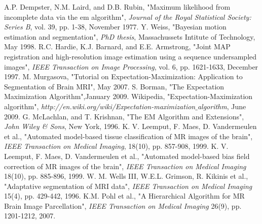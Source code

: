 \begin{thebibliography}{9999}%
%
A.P. Dempster, N.M. Laird, and D.B. Rubin, "Maximum likelihood from incomplete data via the em algorithm", \textsl{Journal of the Royal Statistical Society: Series B}, vol. 39, pp. 1-38, November 1977.
%
Y. Weiss, "Bayesian motion estimation and segmentation", \textsl{PhD thesis}, Massachussets Intitute of Technology, May 1998.
%
R.C. Hardie, K.J. Barnard, and E.E. Armstrong, "Joint MAP registration and high-resolution image estimation using a sequence undersampled images", \textsl{IEEE Transaction on Image Processing}, vol. 6, pp. 1621-1633, December 1997.
%
M. Murgasova, "Tutorial on Expectation-Maximization: Application to Segmentation of Brain MRI", May 2007.
%
S. Borman, "The Expectation Maximization Algorithm",January 2009.
%
Wikipedia, "Expectation-Maximization algorithm", \textsl{http://en.wiki.org/wiki/Expectation-maximization$\_$algorithm}, June 2009.
%
G. McLachlan, and T. Krishnan, "The EM Algorithm and Extensions", \textsl{John Wiley \& Sons}, New York, 1996.
%
K. V. Leemput, F. Maes, D. Vandermeulen et al., "Automated model-based tissue classification of MR images of the brain", \textsl{IEEE Transaction on Medical Imaging}, 18(10), pp. 857-908, 1999.
%
K. V. Leemput, F. Maes, D. Vandermeulen et al., "Automated model-based bias field correction of MR images of the brain", \textsl{IEEE Transaction on Medical Imaging} 18(10), pp. 885-896, 1999.
%
W. M. Wells III, W.E.L. Grimson, R. Kikinis et al., "Adaptative segmentation of MRI data", \textsl{IEEE Transaction on Medical Imaging} 15(4), pp. 429-442, 1996.
%
K.M. Pohl et al., "A Hierarchical Algorithm for MR Brain Image Parcellation", \textsl{IEEE Transaction on Medical Imaging} 26(9), pp. 1201-1212, 2007.

%
\end{thebibliography}
